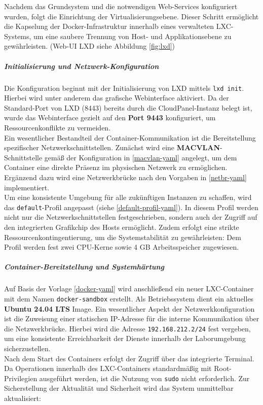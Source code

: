 \documentclass[11pt,
a4paper,
numbers=nonperiod,
footsepline,
oneside,
numbers=noenddot,
bibliography=totoc
]{scrartcl}
\begin{document}
Nachdem das Grundsystem und die notwendigen Web-Services konfiguriert wurden, folgt die Einrichtung der Virtualisierungsebene. Dieser Schritt ermöglicht die Kapselung der Docker-Infrastruktur innerhalb eines verwalteten LXC-Systems, um eine saubere Trennung von Host- und Applikationsebene zu gewährleisten. (Web-UI LXD siehe Abbildung \ref{fig:lxd})
\newpage
\subparagraph{Initialisierung und Netzwerk-Konfiguration}
Die Konfiguration beginnt mit der Initialisierung von LXD mittels \texttt{lxd init}. Hierbei wird unter anderem das grafische Webinterface aktiviert. Da der Standard-Port von LXD (8443) bereits durch die CloudPanel-Instanz belegt ist, wurde das Webinterface gezielt auf den \textbf{Port 9443} konfiguriert, um Ressourcenkonflikte zu vermeiden.\\

Ein wesentlicher Bestandteil der Container-Kommunikation ist die Bereitstellung spezifischer Netzwerkschnittstellen. Zunächst wird eine \textbf{MACVLAN}-Schnittstelle gemäß der Konfiguration in \ref{macvlan-yaml} angelegt, um dem Container eine direkte Präsenz im physischen Netzwerk zu ermöglichen. Ergänzend dazu wird eine Netzwerkbrücke nach den Vorgaben in \ref{netbr-yaml} implementiert.\\

Um eine konsistente Umgebung für alle zukünftigen Instanzen zu schaffen, wird das \texttt{default}-Profil angepasst (siehe \ref{default-profil-yaml}). In diesem Profil werden nicht nur die Netzwerkschnittstellen festgeschrieben, sondern auch der Zugriff auf den integrierten Grafikchip des Hosts ermöglicht. Zudem erfolgt eine strikte Ressourcenkontingentierung, um die Systemstabilität zu gewährleisten: Dem Profil werden fest zwei CPU-Kerne sowie 4 GB Arbeitsspeicher zugewiesen.

\subparagraph{Container-Bereitstellung und Systemhärtung}
Auf Basis der Vorlage \ref{docker-yaml} wird anschließend ein neuer LXC-Container mit dem Namen \texttt{docker-sandbox} erstellt. Als Betriebssystem dient ein aktuelles \textbf{Ubuntu 24.04 LTS} Image. Ein wesentlicher Aspekt der Netzwerkkonfiguration ist die Zuweisung einer statischen IP-Adresse für die interne Kommunikation über die Netzwerkbrücke. Hierbei wird die Adresse \texttt{192.168.212.2/24} fest vergeben, um eine konsistente Erreichbarkeit der Dienste innerhalb der Laborumgebung sicherzustellen.\\

Nach dem Start des Containers erfolgt der Zugriff über das integrierte Terminal. Da Operationen innerhalb des LXC-Containers standardmäßig mit Root-Privilegien ausgeführt werden, ist die Nutzung von \texttt{sudo} nicht erforderlich. Zur Sicherstellung der Aktualität und Sicherheit wird das System unmittelbar aktualisiert:
\end{document}
